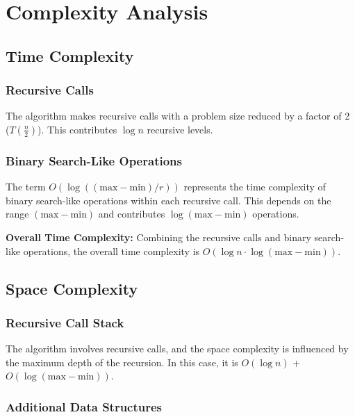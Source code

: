 \documentclass{article}
\begin{document}
\section{Complexity Analysis}

\subsection{Time Complexity}

\subsubsection{Recursive Calls}

The algorithm makes recursive calls with a problem size reduced by a factor of 2 (\(T\left(\frac{n}{2}\right)\)). This contributes \(\log n\) recursive levels.

\subsubsection{Binary Search-Like Operations}

The term \(O(\log((\text{max} - \text{min})/r))\) represents the time complexity of binary search-like operations within each recursive call. This depends on the range \((\text{max} - \text{min})\) and contributes \(\log(\text{max} - \text{min})\) operations.

\textbf{Overall Time Complexity:} Combining the recursive calls and binary search-like operations, the overall time complexity is \(O(\log n \cdot \log(\text{max} - \text{min}))\).

\subsection{Space Complexity}

\subsubsection{Recursive Call Stack}

The algorithm involves recursive calls, and the space complexity is influenced by the maximum depth of the recursion. In this case, it is \(O(\log n)\) + \(O(\log(\text{max} - \text{min}))\).

\subsubsection{Additional Data Structures}
\end{document}
